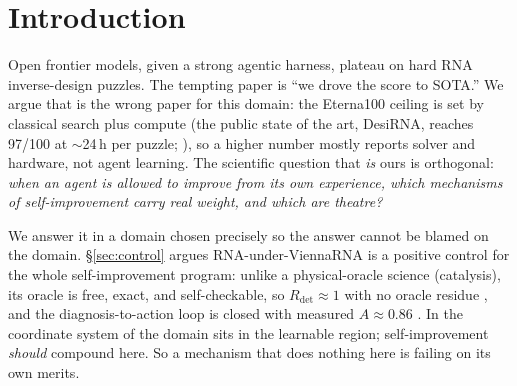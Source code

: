 \documentclass[11pt]{article}
\newcommand{\Rdet}{R_{\mathrm{det}}}
\begin{document}
\section{Introduction}
Open frontier models, given a strong agentic harness, plateau on hard RNA inverse-design puzzles.
The tempting paper is ``we drove the score to SOTA.'' We argue that is the wrong paper for this
domain: the Eterna100 ceiling is set by classical search plus compute (the public state of the art,
DesiRNA, reaches 97/100 at $\sim$24\,h per puzzle; \citealp{wirecki2025desirna,cazenave2025eterna}),
so a higher number mostly reports solver and hardware, not agent learning. The scientific question
that \emph{is} ours is orthogonal: \emph{when an agent is allowed to improve from its own experience,
which mechanisms of self-improvement carry real weight, and which are theatre?}

We answer it in a domain chosen precisely so the answer cannot be blamed on the domain.
\S\ref{sec:control} argues RNA-under-ViennaRNA is a positive control for the whole self-improvement
program: unlike a physical-oracle science (catalysis), its oracle is free, exact, and self-checkable,
so $\Rdet\approx1$ with no oracle residue \citep{oracleresidue}, and the diagnosis-to-action loop is
closed with measured $A\approx0.86$ \citep{actuation}. In the coordinate system of
\citet{determinismmanifold} the domain sits in the learnable region; self-improvement \emph{should}
compound here. So a mechanism that does nothing here is failing on its own merits.
\end{document}
